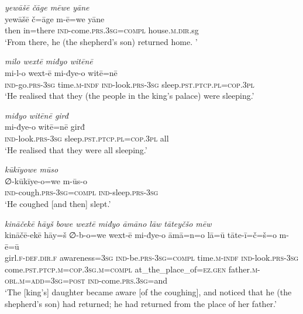\ea \label{KŠ.60}
\textit{yewāšē čāge mēwe yāne} \\ 
\gll yewāšē č=āge m-ē=we yāne \\ 
 then in=there \textsc{ind-}come\textsc{.prs}\textsc{.3sg}\textsc{=compl} house\textsc{.m}\textsc{.dir}.sg \\ 
\glt `From there, he (the shepherd’s son) returned home. '
\z 
 
\ea \label{KŠ.61}
\textit{milo wextē miđyo witēnē} \\ 
\gll mi-l-o wext-ē mi-đye-o witē=nē \\ 
 \textsc{ind-}go\textsc{.prs}\textsc{-3sg} time\textsc{.m}\textsc{-indf} \textsc{ind-}look\textsc{.prs}\textsc{-3sg} sleep\textsc{.pst}\textsc{.ptcp}\textsc{.pl}\textsc{=cop}\textsc{.3pl} \\ 
\glt `He realised that they (the people in the king’s palace) were sleeping.'
\z 
 
\ea \label{KŠ.62}
\textit{miđyo witēnē girđ} \\ 
\gll mi-đye-o witē=nē girđ \\ 
 \textsc{ind-}look\textsc{.prs}\textsc{-3sg} sleep\textsc{.pst}\textsc{.ptcp}\textsc{.pl}\textsc{=cop}\textsc{.3pl} all \\ 
\glt `He realised that they were all  sleeping.'
\z 
 
\ea \label{KŠ.64}
\textit{kūkīyowe mūso} \\ 
\gll ∅-kūkīye-o=we m-ūs-o \\ 
 \textsc{ind-}cough\textsc{.prs}\textsc{-3sg}\textsc{=compl} \textsc{ind-}sleep\textsc{.prs}\textsc{-3sg} \\ 
\glt `He coughed [and then] slept.'
\z 
 
\ea \label{KŠ.65}
\textit{kināčekē hāyš bowe wextē miđyo āmāno lāw tāteyčšo mēw} \\ 
\gll kināčē-ekē hāy=š ∅-b-o=we wext-ē mi-đye-o āmā=n=o lā=ū tāte-ī=č=š=o m-ē=ū \\ 
 girl\textsc{.f}\textsc{-def}\textsc{.dir}\textsc{.f} awareness\textsc{=3sg} \textsc{ind-}be\textsc{.prs}\textsc{-3sg}\textsc{=compl} time\textsc{.m}\textsc{-indf} \textsc{ind-}look\textsc{.prs}\textsc{-3sg} come\textsc{.pst}\textsc{.ptcp}\textsc{.m}\textsc{=cop}\textsc{.3sg}\textsc{.m}\textsc{=compl} at\_the\_place\_of\textsc{\textsc{=ez.gen}} father\textsc{.m}\textsc{-obl}\textsc{.m}\textsc{=add}\textsc{=3sg}\textsc{=\textsc{post}} \textsc{ind-}come\textsc{.prs}\textsc{.3sg}=and \\ 
\glt `The [king’s] daughter became aware [of the coughing], and noticed that he (the shepherd’s son) had returned; he had returned from the place of her father.'
\z 
 
